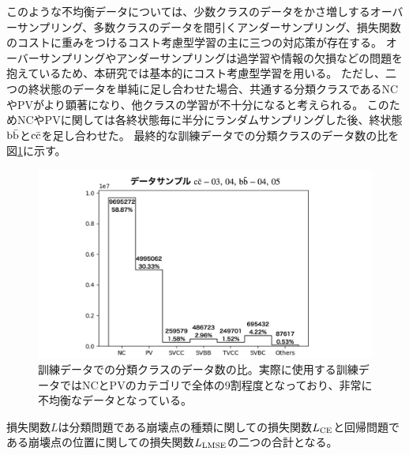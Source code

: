 このような不均衡データについては、少数クラスのデータをかさ増しするオーバーサンプリング、多数クラスのデータを間引くアンダーサンプリング、損失関数のコストに重みをつけるコスト考慮型学習の主に三つの対応策が存在する。
オーバーサンプリングやアンダーサンプリングは過学習や情報の欠損などの問題を抱えているため、本研究では基本的にコスト考慮型学習を用いる。
ただし、二つの終状態のデータを単純に足し合わせた場合、共通する分類クラスであるNCやPVがより顕著になり、他クラスの学習が不十分になると考えられる。
このためNCやPVに関しては各終状態毎に半分にランダムサンプリングした後、終状態$\rm b\bar{b}$と$\rm c\bar{c}$を足し合わせた。
最終的な訓練データでの分類クラスのデータ数の比を図\ref{3-3-2-2ImbalancedData}に示す。

\begin{figure}[htbp]
 \centering
 \includegraphics[width=1.0\textwidth]{Figure/3Networks/3-3-2-2ImbalancedData.png}
 \caption[訓練データでの分類クラスのデータ数の比]{訓練データでの分類クラスのデータ数の比。実際に使用する訓練データではNCとPVのカテゴリで全体の$9$割程度となっており、非常に不均衡なデータとなっている。}
 \label{3-3-2-2ImbalancedData}
\end{figure}

損失関数$L$は分類問題である崩壊点の種類に関しての損失関数$L_{\rm CE}$と回帰問題である崩壊点の位置に関しての損失関数$L_{\rm LMSE}$の二つの合計となる。

